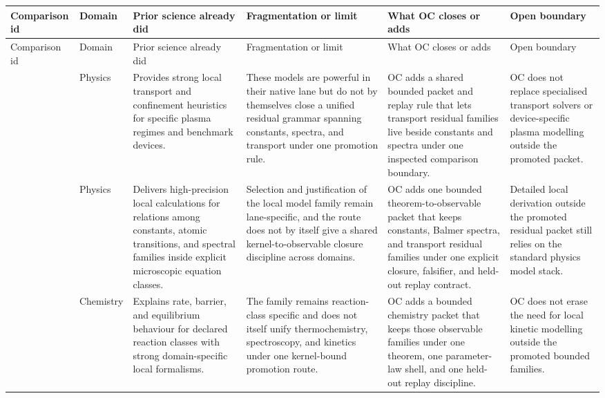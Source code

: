 \begin{longtable}{@{}L{0.17\textwidth}L{0.09\textwidth}L{0.17\textwidth}L{0.17\textwidth}L{0.20\textwidth}L{0.14\textwidth}@{}}
\toprule
Comparison id & Domain & Prior science already did & Fragmentation or limit & What OC closes or adds & Open boundary \\
\midrule
\endfirsthead
\toprule
Comparison id & Domain & Prior science already did & Fragmentation or limit & What OC closes or adds & Open boundary \\
\midrule
\endhead
{} & Physics & Provides strong local transport and confinement heuristics for specific plasma regimes and benchmark devices. & These models are powerful in their native lane but do not by themselves close a unified residual grammar spanning constants, spectra, and transport under one promotion rule. & OC adds a shared bounded packet and replay rule that lets transport residual families live beside constants and spectra under one inspected comparison boundary. & OC does not replace specialised transport solvers or device-specific plasma modelling outside the promoted packet. \\
 & Physics & Delivers high-precision local calculations for relations among constants, atomic transitions, and spectral families inside explicit microscopic equation classes. & Selection and justification of the local model family remain lane-specific, and the route does not by itself give a shared kernel-to-observable closure discipline across domains. & OC adds one bounded theorem-to-observable packet that keeps constants, Balmer spectra, and transport residual families under one explicit closure, falsifier, and held-out replay contract. & Detailed local derivation outside the promoted residual packet still relies on the standard physics model stack. \\
 & Chemistry & Explains rate, barrier, and equilibrium behaviour for declared reaction classes with strong domain-specific local formalisms. & The family remains reaction-class specific and does not itself unify thermochemistry, spectroscopy, and kinetics under one kernel-bound promotion route. & OC adds a bounded chemistry packet that keeps those observable families under one theorem, one parameter-law shell, and one held-out replay discipline. & OC does not erase the need for local kinetic modelling outside the promoted bounded families. \\

\end{longtable}
